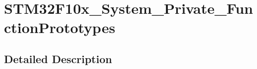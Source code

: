 \hypertarget{group___s_t_m32_f10x___system___private___function_prototypes}{}\section{S\+T\+M32\+F10x\+\_\+\+System\+\_\+\+Private\+\_\+\+Function\+Prototypes}
\label{group___s_t_m32_f10x___system___private___function_prototypes}


\subsection{Detailed Description}
